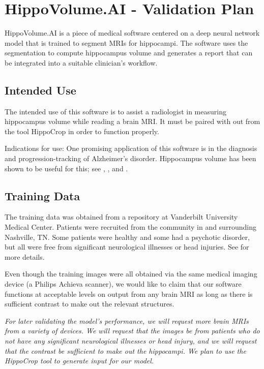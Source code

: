 \documentclass{article}
\begin{document}
\section*{HippoVolume.AI - Validation Plan}

HippoVolume.AI is a piece of medical software centered on a deep neural network model that is trained
to segment MRIs for hippocampi.
The software uses the segmentation to
compute hippocampus volume and generates a report that can be integrated into a suitable clinician's workflow.

\subsection*{Intended Use}

The intended use of this software is to assist a radiologist in measuring hippocampus volume while reading a brain MRI.
It must be paired with out from the tool HippoCrop in order to function properly.

Indications for use:
One promising application of this software is in the diagnosis and progression-tracking of Alzheimer's disorder.
Hippocampus volume has been shown to be useful for this; see \cite{franko}, \cite{jack}, and \cite{moon}.

\subsection*{Training Data}

The training data was obtained from a repository at Vanderbilt University Medical Center.
Patients were recruited from the community in and surrounding Nashville, TN.
Some patients were healthy and some had a psychotic disorder, but all were free
from significant neurological illnesses or head injuries.
See \cite{data_paper} for more details.

Even though the training images were all obtained via the same medical imaging device (a Philips Achieva scanner),
we would like to claim that our software functions at acceptable levels on output from any brain MRI as long as there is sufficient contrast
to make out the relevant structures.

\textit{For later validating the model's performance, we will request more brain MRIs from a variety of devices.
We will request that the images be from patients who do not have any significant neurological illnesses or head injury,
and we will request that the contrast be sufficient to make out the hippocampi. We plan to use the HippoCrop tool to generate
input for our model.}
\end{document}

